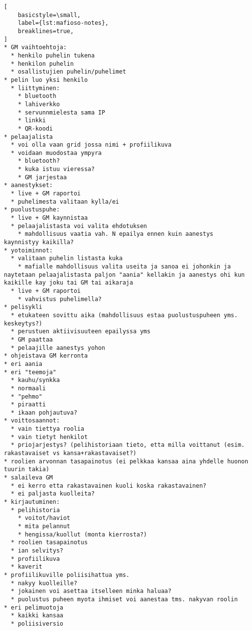 \begin{lstlisting}[
    basicstyle=\small,
    label={lst:mafioso-notes},
    breaklines=true,
]
* GM vaihtoehtoja:
  * henkilo puhelin tukena
  * henkilon puhelin
  * osallistujien puhelin/puhelimet
* pelin luo yksi henkilo
  * liittyminen:
    * bluetooth
    * lahiverkko
    * servunnmielesta sama IP
    * linkki
    * QR-koodi
* pelaajalista
  * voi olla vaan grid jossa nimi + profiilikuva
  * voidaan muodostaa ympyra
    * bluetooth?
    * kuka istuu vieressa?
    * GM jarjestaa
* aanestykset:
  * live + GM raportoi
  * puhelimesta valitaan kylla/ei
* puolustuspuhe:
  * live + GM kaynnistaa
  * pelaajalistasta voi valita ehdotuksen
    * mahdollisuus vaatia vah. N epailya ennen kuin aanestys kaynnistyy kaikilla?
* yotoiminnot:
  * valitaan puhelin listasta kuka
    * mafialle mahdollisuus valita useita ja sanoa ei johonkin ja naytetaan pelaajalistasta paljon "aania" kellakin ja aanestys ohi kun kaikille kay joku tai GM tai aikaraja
  * live + GM raportoi
    * vahvistus puhelimella?
* pelisykli
  * etukateen sovittu aika (mahdollisuus estaa puolustuspuheen yms. keskeytys?)
  * perustuen aktiivisuuteen epailyssa yms
  * GM paattaa
  * pelaajille aanestys yohon
* ohjeistava GM kerronta
* eri aania
* eri "teemoja"
  * kauhu/synkka
  * normaali
  * "pehmo"
  * piraatti
  * ikaan pohjautuva?
* voittosaannot:
  * vain tiettya roolia
  * vain tietyt henkilot
  * priojarjestys? (pelihistoriaan tieto, etta milla voittanut (esim. rakastavaiset vs kansa+rakastavaiset?)
* roolien arvonnan tasapainotus (ei pelkkaa kansaa aina yhdelle huonon tuurin takia)
* salaileva GM
  * ei kerro etta rakastavainen kuoli koska rakastavainen?
  * ei paljasta kuolleita?
* kirjautuminen:
  * pelihistoria
    * voitot/haviot
    * mita pelannut
    * hengissa/kuollut (monta kierrosta?)
  * roolien tasapainotus
  * ian selvitys?
  * profiilikuva
  * kaverit
* profiilikuville poliisihattua yms.
  * nakyy kuolleille?
  * jokainen voi asettaa itselleen minka haluaa?
  * puolustus puheen myota ihmiset voi aanestaa tms. nakyvan roolin
* eri pelimuotoja
  * kaikki kansaa
  * poliisiversio
\end{lstlisting}
